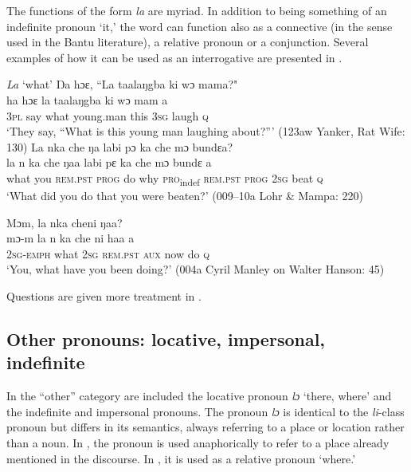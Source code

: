 The functions of the form \textit{la} are myriad. In addition to being something of an indefinite pronoun ‘it,' the word can function also as a connective (in the sense used in the Bantu literature), a relative pronoun or a conjunction. Several examples of how it can be used as an interrogative are presented in .

\ea%
    \label{ex:66} \textit{La} ‘what'
    \ea Ŋa hɔɛ, “La taalaŋgba ki wɔ mama?"\\
    \gll ha    hɔɛ  la    taalaŋgba    ki    wɔ    mam    a\\
    3\textsc{pl}  say  what  young.man    this  \textsc{3sg}  laugh    \textsc{q}\\
    \glt ‘They say, “What is this young man\footnotemark{} laughing about?”' (123aw Yanker, Rat Wife: 130)
\newpage
    \ex La nka che ŋa labi pɔ ka che mɔ bundɛa?\\
    \gll la    n    ka      che  ŋaa  labi  pɛ      ka      che  mɔ  bundɛ  a\\
    what  you  \textsc{rem.pst}  \textsc{prog}  do    why  \textsc{pro}\textsubscript{indef}  \textsc{rem.pst}  \textsc{prog}  \textsc{2sg}  beat    \textsc{q}\\
    \glt‘What did you do that you were beaten?' (009--10a Lohr \& Mampa: 220)

    \ex Mɔm, la nka cheni ŋaa?\\
    \gll mɔ-m      la    n    ka      che  ni    haa  a\\
    \textsc{2sg-emph}  what  \textsc{2sg}  \textsc{rem.pst}  \textsc{aux}  now  do    \textsc{q}\\
    \glt ‘You, what have you been doing?' (004a Cyril Manley on Walter Hanson: 45)
\z
\z

Questions are given more treatment in .

\subsection{Other pronouns: locative, impersonal, indefinite} \label{sec:3.3.5}
\hypertarget{Toc115517767}{}
In the “other” category are included the locative pronoun \textit{lɔ} ‘there, where' and the indefinite and impersonal pronouns. The pronoun \textit{lɔ} is identical to the \textit{li}{}-class pronoun but differs in its semantics, always referring to a place or location rather than a noun. In , the pronoun is used anaphorically to refer to a place already mentioned in the discourse. In , it is used as a relative pronoun ‘where.'

